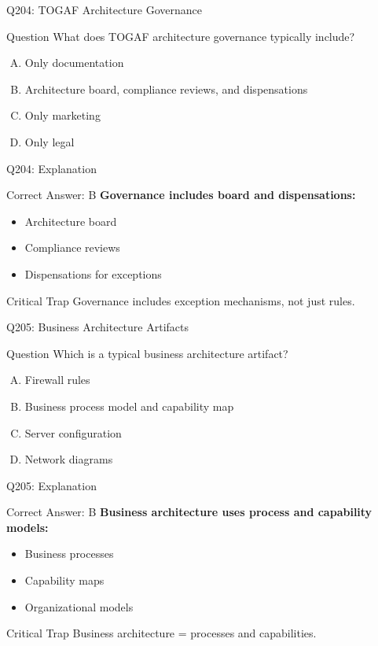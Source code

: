 \documentclass{beamer}
\begin{document}
	\begin{frame}{Q204: TOGAF Architecture Governance}
		\begin{block}{Question}
			What does TOGAF architecture governance typically include?
		\end{block}
		\begin{enumerate}[(A)]
			\item Only documentation
			\item Architecture board, compliance reviews, and dispensations
			\item Only marketing
			\item Only legal
		\end{enumerate}
	\end{frame}
	
	\begin{frame}{Q204: Explanation}
		\begin{block}{Correct Answer: B}
			\textbf{Governance includes board and dispensations:}
			\begin{itemize}
				\item Architecture board
				\item Compliance reviews
				\item Dispensations for exceptions
			\end{itemize}
		\end{block}
		\begin{alertblock}{Critical Trap}
			Governance includes exception mechanisms, not just rules.
		\end{alertblock}
	\end{frame}
	
	\begin{frame}{Q205: Business Architecture Artifacts}
		\begin{block}{Question}
			Which is a typical business architecture artifact?
		\end{block}
		\begin{enumerate}[(A)]
			\item Firewall rules
			\item Business process model and capability map
			\item Server configuration
			\item Network diagrams
		\end{enumerate}
	\end{frame}
	
	\begin{frame}{Q205: Explanation}
		\begin{block}{Correct Answer: B}
			\textbf{Business architecture uses process and capability models:}
			\begin{itemize}
				\item Business processes
				\item Capability maps
				\item Organizational models
			\end{itemize}
		\end{block}
		\begin{alertblock}{Critical Trap}
			Business architecture = processes and capabilities.
		\end{alertblock}
	\end{frame}
	
\end{document}
